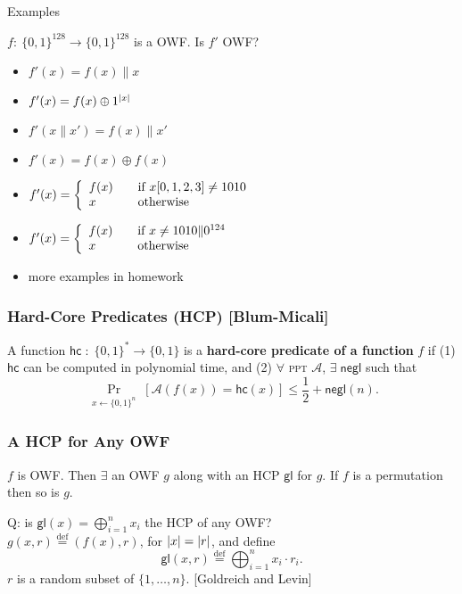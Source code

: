 \begin{frame}{Examples}
\begin{exampleblock}{$f:\ \{0,1\}^{128} \to \{0,1\}^{128}$ is a OWF. Is $f'$ OWF?}
\begin{itemize}
\item $f'(x) = f(x)\| x$
\item $f'(x) = f(x)\oplus 1^{\lvert x\rvert}$
\item $f'(x\|x') = f(x)\|x'$
\item $f'(x) = f(x) \oplus f(x)$
\item $ f'(x) = \left\{ 
  \begin{array}{l l}
    f(x) & \quad \text{if $x[0,1,2,3] \neq 1010$}\\
    x & \quad \text{otherwise}\\
  \end{array} \right. $
\item $ f'(x) = \left\{ 
  \begin{array}{l l}
    f(x) & \quad \text{if $x \neq 1010\|0^{124}$}\\
    x & \quad \text{otherwise}\\
  \end{array} \right. $
\item more examples in homework
\end{itemize}
\end{exampleblock}
\end{frame}
\begin{frame}\frametitle{Hard-Core Predicates (HCP) [Blum-Micali]}
\begin{figure}
\begin{center}

\end{center}
\end{figure}
\begin{definition}
A function $\mathsf{hc}\; : \; \{0,1\}^* \to \{0,1\}$ is a \textbf{hard-core predicate of a function} $f$ if (1) $\mathsf{hc}$ can be computed in polynomial time, and (2) $\forall$ \textsc{ppt} $\mathcal{A}$, $\exists\; \mathsf{negl}$ such that
\[ \Pr_{\substack{x \gets \{0,1\}^n}}[\mathcal{A}(f(x)) = \mathsf{hc}(x)] \le \frac{1}{2} + \mathsf{negl}(n). \]
\end{definition}
\end{frame}
\begin{frame}\frametitle{A HCP for Any OWF}
\begin{theorem}
$f$ is OWF. Then $\exists$ an OWF $g$ along with an HCP $\mathsf{gl}$ for $g$. If $f$ is a permutation then so is $g$.
\end{theorem}
\alert{Q: is $\mathsf{gl}(x) = \bigoplus^{n}_{i=1} x_i$ the HCP of any OWF?}\\

$g(x,r) \overset{\text{def}}{=} (f(x), r)$, for $\lvert x\rvert = \lvert r\rvert$, and define
\[ \mathsf{gl}(x,r) \overset{\text{def}}{=} \bigoplus^{n}_{i=1} x_i \cdot r_i. \]
$r$ is a random subset of $\{ 1,\dotsc, n \}$. [Goldreich and Levin]
\end{frame}
